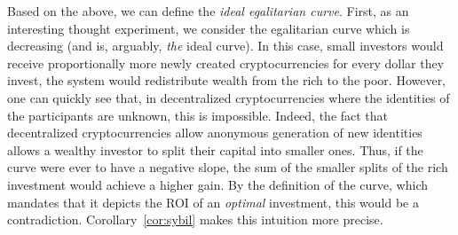 Based on the above, we can define the \emph{ideal egalitarian curve}. First,
as an interesting thought experiment, we consider the egalitarian curve which
is decreasing (and is, arguably, \emph{the} ideal curve). In this case, small
investors would receive proportionally more newly created cryptocurrencies for
every dollar they invest, \ie the system would redistribute wealth from the
rich to the poor. However, one can quickly see that, in decentralized
cryptocurrencies where the identities of the participants are unknown, this is
impossible. Indeed, the fact that decentralized cryptocurrencies allow
anonymous generation of new identities~\cite{douceur2002sybil} allows a wealthy
investor to split their capital into smaller ones. Thus, if the curve were ever
to have a negative slope, the sum of the smaller splits of the rich investment
would achieve a higher gain. By the definition of the curve, which mandates
that it depicts the ROI of an \emph{optimal} investment, this would be a
contradiction. Corollary~\ref{cor:sybil} makes this intuition more precise.

